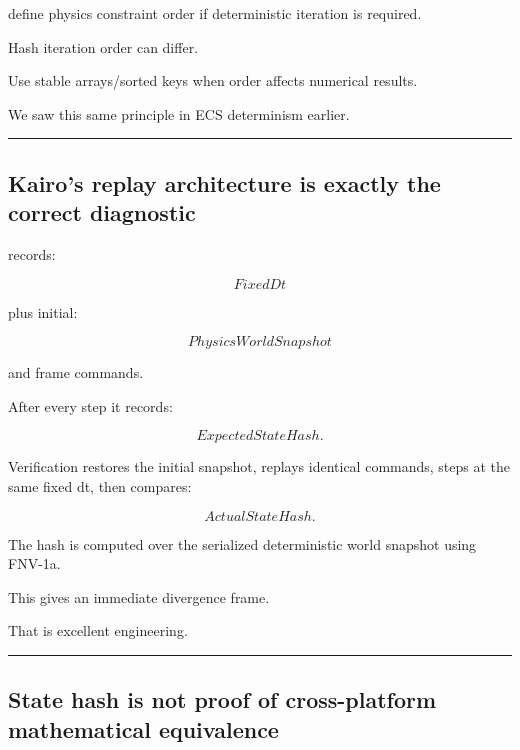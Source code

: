 define physics constraint order if deterministic iteration is required.

Hash iteration order can differ.

Use stable arrays/sorted keys when order affects numerical results.

We saw this same principle in ECS determinism earlier.

\begin{center}\rule{0.5\linewidth}{0.5pt}\end{center}

\subsection{Kairo's replay architecture is exactly the correct diagnostic}\label{06-engine-ii-ch039-kairos-replay-architecture-is-exactly-the-correct-diagnostic}

\hypertarget{06-engine-ii-ch039-kairos-replay-architecture-is-exactly-the-correct-diagnostic}{}

 records:

\[
FixedDt
\]

plus initial:

\[
PhysicsWorldSnapshot
\]

and frame commands.

After every step it records:

\[
ExpectedStateHash.
\]

Verification restores the initial snapshot, replays identical commands, steps at the same fixed dt, then compares:

\[
ActualStateHash.
\]

The hash is computed over the serialized deterministic world snapshot using FNV-1a.

This gives an immediate divergence frame.

That is excellent engineering.

\begin{center}\rule{0.5\linewidth}{0.5pt}\end{center}

\subsection{State hash is not proof of cross-platform mathematical equivalence}\label{06-engine-ii-ch039-state-hash-is-not-proof-of-cross-platform-mathematical-equivalence}

